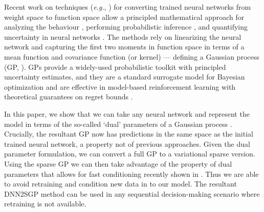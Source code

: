 \documentclass{article}
\makeatletter
\newcommand{\eg}{\textit{e.g.\@}\xspace}
\makeatother
\begin{document}
Recent work on techniques (\eg, \cite{list}) for converting trained neural networks from weight space to function space allow a principled mathematical approach for analyzing the behaviour \cite{add}, performing probabilistic inference \cite{add}, and quantifying uncertainty in neural networks \cite{add}. The methods rely on linearizing the neural network and capturing the first two moments in function space in terms of a mean function and covariance function (or kernel) --- defining a Gaussian process (GP, \cite{rasmussen2006gaussian}). GPs provide a widely-used probabilistic toolkit with principled uncertainty estimates, and they are a standard surrogate model for Bayesian optimization \citep{garnett_bayesoptbook_2022} and are effective in model-based reinforcement learning \citep{deisenroth2011pilco} with theoretical guarantees on regret bounds \citep{srinivas2009gaussian}. 

In this paper, we show that we can take any neural network and represent the model in terms of the so-called `dual' parameters of a Gaussian process \cite{csato2002sparse, adam2021dual, chang2020fast}. Crucially, the resultant GP now has predictions in the same space as the initial trained neural network, a property not of previous approaches. Given the dual parameter formulation, we can convert a full GP to a variational sparse version. Using the sparse GP we can then take advantage of the property of dual parameters that allows for fast conditioning recently shown in \cite{chang2022fantasizing}. Thus we are able to avoid retraining and condition new data in to our model. The resultant DNN2SGP method can be used in any sequential decision-making scenario where retraining is not available.%
\end{document}
